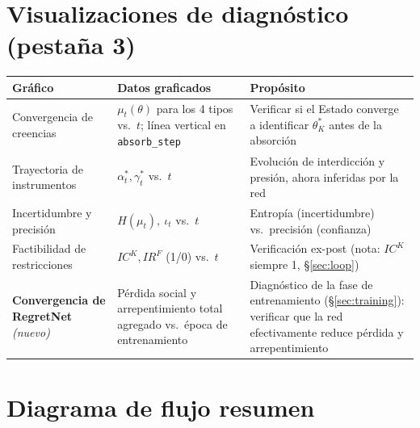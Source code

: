 \documentclass[ecta,nameyear,draft]{econsocart}
\newcommand{\pyvar}[1]{\texttt{#1}}
\begin{document}
\section{Visualizaciones de diagnóstico (pestaña 3)}

\begin{center}
\footnotesize
\begin{tabular}{@{}p{3.3cm}p{3.9cm}p{5.1cm}@{}}
\toprule
\textbf{Gráfico} & \textbf{Datos graficados} & \textbf{Propósito} \\
\midrule
Convergencia de creencias & $\mu_t(\theta)$ para los 4 tipos vs.\ $t$; línea vertical en \pyvar{absorb\_step} & Verificar si el Estado converge a identificar $\theta_K^\ast$ antes de la absorción \\
Trayectoria de instrumentos & $\alpha_t^\ast,\gamma_t^\ast$ vs.\ $t$ & Evolución de interdicción y presión, ahora inferidas por la red \\
Incertidumbre y precisión & $H(\mu_t),\ \iota_t$ vs.\ $t$ & Entropía (incertidumbre) vs.\ precisión (confianza) \\
Factibilidad de restricciones & $IC^K, IR^F$ (1/0) vs.\ $t$ & Verificación ex-post (nota: $IC^K$ siempre 1, \S\ref{sec:loop}) \\
\textbf{Convergencia de RegretNet} \emph{(nuevo)} & Pérdida social y arrepentimiento total agregado vs.\ época de entrenamiento & Diagnóstico de la fase de entrenamiento (\S\ref{sec:training}): verificar que la red efectivamente reduce pérdida y arrepentimiento \\
\bottomrule
\end{tabular}
\normalsize
\end{center}

\section{Diagrama de flujo resumen}
\end{document}

